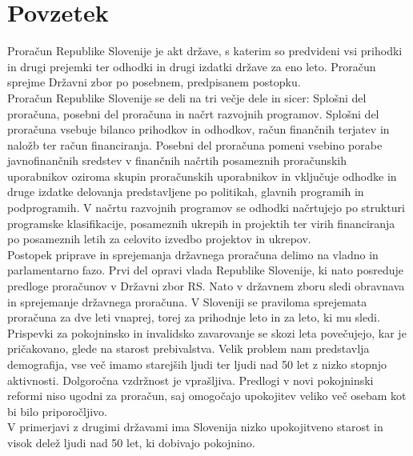 \documentclass[12pt, a4paper]{article}
\begin{document}
\section*{Povzetek}
\hspace*{5mm} Proračun Republike Slovenije je akt države, s katerim so predvideni vsi prihodki in drugi prejemki ter odhodki in drugi izdatki države za eno leto. Proračun sprejme Državni zbor po posebnem, predpisanem postopku. \\
\hspace*{5mm} Proračun Republike Slovenije se deli na tri večje dele in sicer: Splošni del proračuna, posebni del proračuna in načrt razvojnih programov. Splošni del proračuna vsebuje bilanco prihodkov in odhodkov, račun finančnih terjatev in naložb ter račun financiranja. Posebni del proračuna pomeni vsebino porabe javnofinančnih sredstev v finančnih načrtih posameznih proračunskih uporabnikov oziroma skupin proračunskih uporabnikov in vključuje odhodke in druge izdatke delovanja predstavljene po politikah, glavnih programih in podprogramih.  V načrtu razvojnih programov se odhodki načrtujejo po strukturi programske klasifikacije, posameznih ukrepih in projektih ter virih financiranja po posameznih letih za celovito izvedbo projektov in ukrepov. \\
\hspace*{5mm} Postopek priprave in sprejemanja državnega proračuna delimo na vladno in parlamentarno fazo. Prvi del opravi vlada Republike Slovenije, ki nato posreduje predloge proračunov v Državni zbor RS. Nato v državnem zboru sledi obravnava in sprejemanje državnega proračuna. V Sloveniji se praviloma sprejemata proračuna za dve leti vnaprej, torej za prihodnje leto in za leto, ki mu sledi. \\
\hspace*{5mm} Prispevki za pokojninsko in invalidsko zavarovanje se skozi leta povečujejo, kar je pričakovano, glede na starost prebivalstva. Velik problem nam predstavlja demografija, vse več imamo starejših ljudi ter ljudi nad 50 let z nizko stopnjo aktivnosti. Dolgoročna vzdržnost je vprašljiva. Predlogi v novi pokojninski reformi niso ugodni za proračun, saj omogočajo upokojitev veliko več osebam kot bi bilo priporočljivo. \\
\hspace*{5mm} V primerjavi z drugimi državami ima Slovenija nizko upokojitveno starost in visok delež ljudi nad 50 let, ki dobivajo pokojnino.\\
\end{document}
